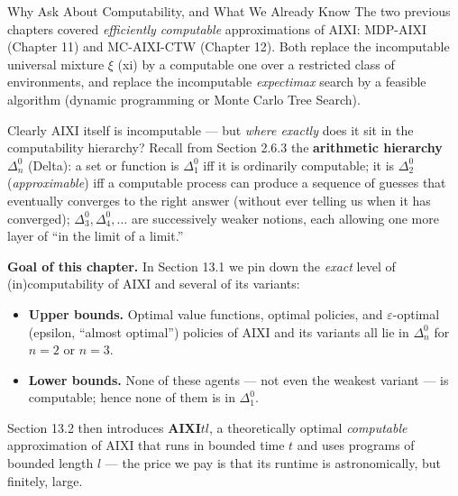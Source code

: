 \documentclass[aspectratio=169,10pt]{beamer}
\begin{document}
\begin{frame}[allowframebreaks]{Why Ask About Computability, and What We Already Know}
  The two previous chapters covered \emph{efficiently computable} approximations
  of AIXI: MDP-AIXI (Chapter 11) and MC-AIXI-CTW (Chapter 12). Both replace the
  incomputable universal mixture $\xi$ (xi) by a computable one over a
  restricted class of environments, and replace the incomputable
  \emph{expectimax} search by a feasible algorithm (dynamic programming or
  Monte Carlo Tree Search).

  \bigskip
  Clearly AIXI itself is incomputable --- but \emph{where exactly} does it sit
  in the computability hierarchy? Recall from Section 2.6.3 the
  \textbf{arithmetic hierarchy} $\Delta_n^0$ (Delta): a set or function is
  $\Delta_1^0$ iff it is ordinarily computable; it is $\Delta_2^0$
  (\emph{approximable}) iff a computable process can produce a sequence of
  guesses that eventually converges to the right answer (without ever telling
  us when it has converged); $\Delta_3^0, \Delta_4^0,\dots$ are successively
  weaker notions, each allowing one more layer of ``in the limit of a limit.''

  \bigskip
  \textbf{Goal of this chapter.} In Section 13.1 we pin down the \emph{exact}
  level of (in)computability of AIXI and several of its variants:
  \begin{itemize}
    \item \textbf{Upper bounds.} Optimal value functions, optimal policies,
      and $\varepsilon$-optimal (epsilon, ``almost optimal'') policies of AIXI
      and its variants all lie in $\Delta_n^0$ for $n=2$ or $n=3$.
    \item \textbf{Lower bounds.} None of these agents --- not even the
      weakest variant --- is computable; hence none of them is in
      $\Delta_1^0$.
  \end{itemize}
  Section 13.2 then introduces \textbf{AIXI$tl$}, a theoretically optimal
  \emph{computable} approximation of AIXI that runs in bounded time $t$ and
  uses programs of bounded length $l$ --- the price we pay is that its
  runtime is astronomically, but finitely, large.
\end{frame}
\end{document}
